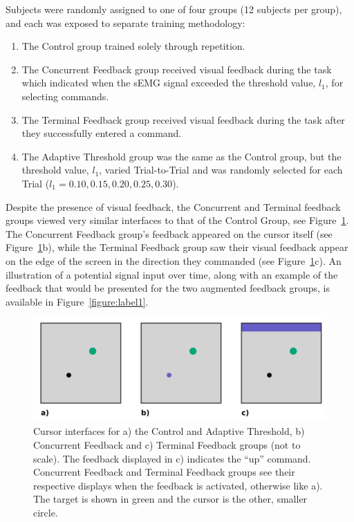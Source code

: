 Subjects were randomly assigned to one of four groups (12 subjects per group), and each was exposed to separate training methodology:
\begin{enumerate}
	\item The Control group trained solely through repetition.
	\item The Concurrent Feedback group received visual feedback during the task which indicated when the sEMG signal exceeded the threshold value, $l_1$, for selecting commands.
	\item The Terminal Feedback group received visual feedback during the task after they successfully entered a command.
	\item The Adaptive Threshold group was the same as the Control group, but the threshold value, $l_1$, varied Trial-to-Trial and was randomly selected for each Trial ($l_1 = 0.10, 0.15, 0.20, 0.25, 0.30$).
\end{enumerate}
Despite the presence of visual feedback, the Concurrent and Terminal feedback groups viewed very similar interfaces to that of the Control Group, see Figure~\ref{figure:label2}.
The Concurrent Feedback group's feedback appeared on the cursor itself (see Figure~\ref{figure:label2}b), while the Terminal Feedback group saw their visual feedback appear on the edge of the screen in the direction they commanded (see Figure~\ref{figure:label2}c).
An illustration of a potential signal input over time, along with an example of the feedback that would be presented for the two augmented feedback groups, is available in Figure~\ref{figure:label1}.

\begin{figure}[b!]
	\centering
	\includegraphics[width=.8\linewidth]{figures/EMG/Figure2}
	\caption[Cursor interfaces]{Cursor interfaces for a) the Control and Adaptive Threshold, b) Concurrent Feedback and c) Terminal Feedback groups (not to scale).
		The feedback displayed in c) indicates the ``up'' command.
		Concurrent Feedback and Terminal Feedback groups see their respective displays when the feedback is activated, otherwise like a).
		The target is shown in green and the cursor is the other, smaller circle.}
	\label{figure:label2}
\end{figure}

